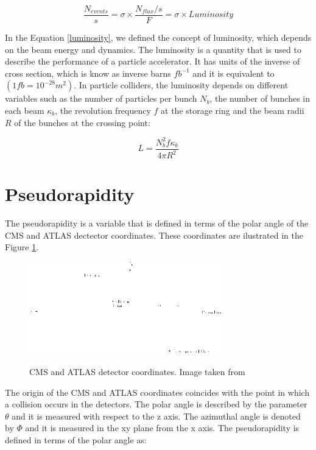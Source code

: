  \begin{equation}
 \label{luminosity}
  \frac{N_{events}}{s} = \sigma \times \frac{N_{flux}/s}{F} = \sigma \times Luminosity
 \end{equation}

 In the Equation \ref{luminosity}, we defined the concept of luminosity, which depends on the beam energy and dynamics.  The luminosity is a quantity that is used to 
 describe the performance of a particle accelerator. It has units of the inverse of cross section, which is know as inverse barns $fb^{-1}$ and it is equivalent to $(1 fb = 10^{-28} m^2)$. 
 In particle colliders, the 
 luminosity depends on different variables such as the number of particles per bunch $N_b$, the number of bunches in each beam $\kappa_b$, the revolution frequency $f$ at the storage ring and the beam radii 
 $R$ of the bunches at the crossing point:
 
 \begin{equation}
  L = \frac{N_b^2 f \kappa_b}{4\pi R^2} 
 \end{equation}

 \section{Pseudorapidity}
  
The pseudorapidity is a variable that is defined in terms of the polar angle of the CMS and ATLAS dectector coordinates. These coordinates are ilustrated in the Figure \ref{CMSCoordinates}.
 
 \begin{figure}[h]
 \centering
 \caption{CMS and ATLAS detector coordinates. Image taken from \cite{CMS_ATLAS_coordinates}}
 \includegraphics[width=0.75\textwidth]{./Capitulos/VariableDefinitions/CMS_coordinates}  
 \label{CMSCoordinates}
 \end{figure}

The origin of the CMS and ATLAS coordinates coincides with the point in which a collision occurs in the detectors. 
The polar angle is described by the parameter $\theta$ and it is measured with respect to the z axis.
The azimuthal angle is denoted by $\Phi$ and it is measured in the xy plane from the x axis. The pseudorapidity is defined in terms of the polar angle as:


